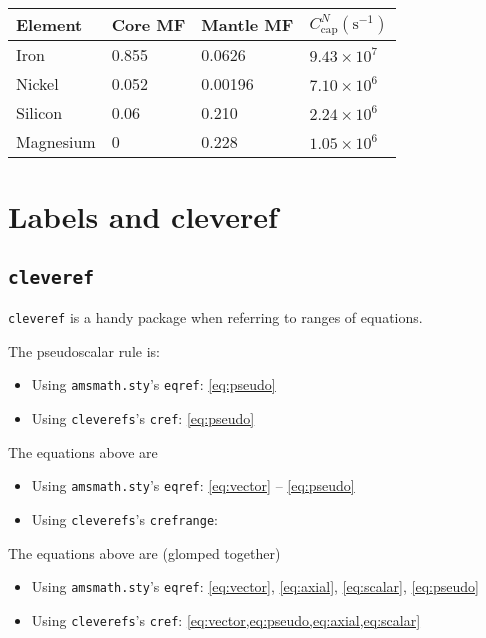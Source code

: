 	\begin{tabular}{ @{} llll @{} } \toprule %
		Element 
		& Core MF 
		& Mantle MF 
		& $C_\text{cap}^N (\text{s}^{-1})$ 
		\\ \hline
		Iron 
		& 0.855 
		& 0.0626 
		& $9.43\times 10^{7}$ 
		\\
		Nickel 
		& 0.052 
		& 0.00196 
		& $7.10\times 10^{6}$ 
		\\
		Silicon 
		& 0.06 
		& 0.210 
		& $2.24\times 10^{6}$ 
		\\
		Magnesium 
		& 0 
		& 0.228 
		& $1.05\times 10^{6}$ 
		\\ \bottomrule
	\end{tabular}




\section{Labels and cleveref}
\label{sec:labels:and:cleveref}

\subsection{\texorpdfstring{\texttt{cleveref}}{cleveref}}
\label{sec:cleveref}

\texttt{cleveref} is a handy package when referring to ranges of equations. 

The pseudoscalar rule is:
\begin{itemize}
	\item Using \texttt{amsmath.sty}'s \texttt{eqref}: \eqref{eq:pseudo}
	\item Using \texttt{cleverefs}'s \texttt{cref}: \cref{eq:pseudo}
\end{itemize}

The equations above are
\begin{itemize}
	\item Using \texttt{amsmath.sty}'s \texttt{eqref}: \eqref{eq:vector} -- \eqref{eq:pseudo}
	\item Using \texttt{cleverefs}'s \texttt{crefrange}: 
\end{itemize}

The equations above are (glomped together)
\begin{itemize}
	\item Using \texttt{amsmath.sty}'s \texttt{eqref}: \eqref{eq:vector}, \eqref{eq:axial}, \eqref{eq:scalar}, \eqref{eq:pseudo}
	\item Using \texttt{cleverefs}'s \texttt{cref}: \cref{eq:vector,eq:pseudo,eq:axial,eq:scalar}
\end{itemize}


